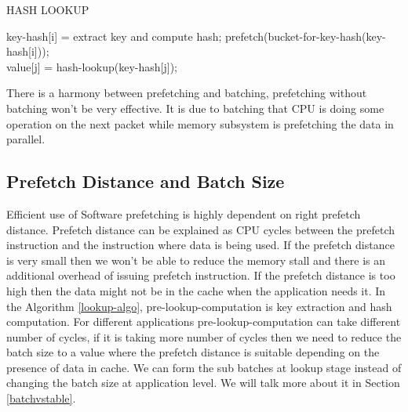 \begin{algorithm}[H]
 \caption{HASH LOOKUP}
 \label{lookup-algo}
 \begin{algorithmic}[1]
     \State key-hash[i] = extract key and compute hash; \label{hash-compute-line}
     \State prefetch(bucket-for-key-hash(key-hash[i])); \label{prefetch-line}
 \EndFor
 \\
     \State value[j] = hash-lookup(key-hash[j]); \label{hash-lookup-line}
 \EndFor
 \end{algorithmic}
\end{algorithm}
There is a harmony between prefetching and batching, prefetching without batching won't be very effective. It is due to batching that CPU is doing some operation on the next packet while memory subsystem is prefetching the data in parallel.

\subsection{Prefetch Distance and Batch Size}
\label{subbatching}
Efficient use of Software prefetching is highly dependent on right prefetch distance. Prefetch distance can be explained as CPU cycles between the prefetch instruction and the instruction where data is being used. If the prefetch distance is very small then we won't be able to reduce the memory stall and there is an additional overhead of issuing prefetch instruction. If the prefetch distance is too high then the data might not be in the cache when the application needs it. In the Algorithm \ref{lookup-algo}, pre-lookup-computation is key extraction and hash computation. For different applications pre-lookup-computation can take different number of cycles, if it is taking more number of cycles then we need to reduce the batch size to a value where the prefetch distance is suitable depending on the presence of data in cache. We can form the sub batches at lookup stage instead of changing the batch size at application level. We will talk more about it in Section \ref{batchvstable}.

